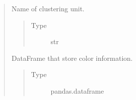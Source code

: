 \documentclass[letterpaper,10pt,english]{sphinxmanual}
\begin{document}
\begin{quote}
\begin{fulllineitems}
\begin{fulllineitems}
\begin{quote}
\begin{description}
\end{description}\end{quote}

\end{fulllineitems}


\begin{fulllineitems}
\label{\detokenize{modules/celloracle.network_analysis:celloracle.network_analysis.Links.name}}
Name of clustering unit.
\begin{quote}\begin{description}
\item[{Type}] \leavevmode
str

\end{description}\end{quote}

\end{fulllineitems}


\begin{fulllineitems}
\label{\detokenize{modules/celloracle.network_analysis:celloracle.network_analysis.Links.palette}}
DataFrame that store color information.
\begin{quote}\begin{description}
\item[{Type}] \leavevmode
pandas.dataframe

\end{description}\end{quote}

\end{fulllineitems}



\end{fulllineitems}
\end{quote}
\end{document}
